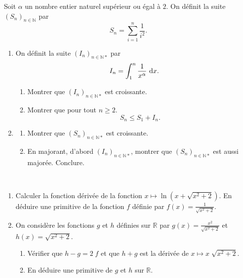 \begin{exo}
      Soit $\alpha$ un nombre entier naturel sup\'erieur ou \'egal \`a $2$.
      On d\'efinit la suite $(S_n)_{n\in\mathbb{N}}$ par 
            \[
                  S_n= \sum_{i=1}^n \frac{1}{i^2}      .
            \]
      \begin{enumerate}
            \item On d\'efinit la suite $(I_n)_{n\in\mathbb{N}*}$ par 
                  \[
                        I_n = \int_{1}^{n} \frac{1}{x^\alpha} ~\mathrm{d}x      .
                  \]
                  \begin{enumerate}
                        \item Montrer que $(I_n)_{n\in\mathbb{N}*}$ est croissante.
                        \item Montrer que pour tout $n\geq 2$.
                              \[
                                    S_n \leq S_1+ I_n      .
                              \]
                  \end{enumerate}
            \item \begin{enumerate}
                        \item Montrer que $(S_n)_{n\in\mathbb{N}*}$ est croissante.
                        \item En majorant, d'abord $(I_n)_{n\in\mathbb{N}*}$, 
                              montrer que $(S_n)_{n\in\mathbb{N}*}$ est aussi major\'ee.
                              Conclure.
                  \end{enumerate}
      \end{enumerate}
\end{exo}
\begin{exo} ~ \newline
\begin{enumerate}
\item Calculer la fonction d\'eriv\'ee de la fonction $x \mapsto \ln \left( x + \sqrt{x^2 + 2} \right) $.
      En d\'eduire une primitive de la fonction $f$ d\'efinie par $f(x) = \frac{1}{\sqrt{x^2 + 2}}$.
\item On consid\`ere les fonctions $g$ et $h$ d\'efinies sur $\mathbb{R}$ par 
      $g(x) = \frac{x^2}{\sqrt{x^2 + 2}}$ et $h(x) = \sqrt{x^2 + 2}$.
      \begin{enumerate}
      \item V\'erifier que $h - g = 2 \; f$ et que $h + g$ est la d\'eriv\'ee de $x \mapsto x \; \sqrt{x^2 + 2}$.
      \item En d\'eduire une primitive de $g$ et $h$ sur $\mathbb{R}$.
      \end{enumerate}
\end{enumerate}
\end{exo}
